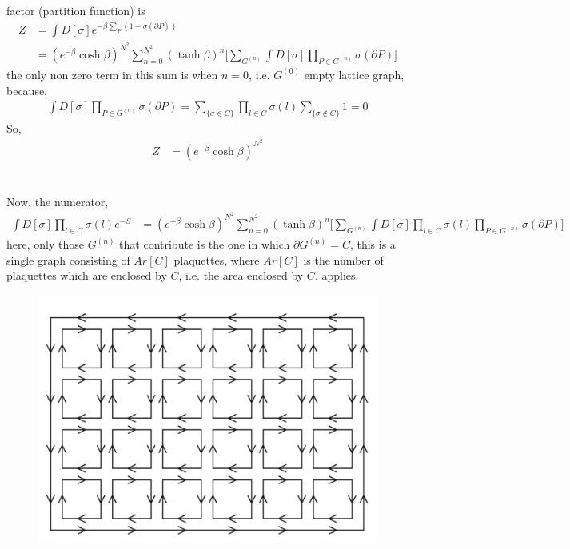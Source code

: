 \documentclass[]{article}
\numberwithin{equation}{section}
\begin{document}
factor (partition function) is
\begin{align}
    Z &=  \int D[\sigma]e^{-\beta\sum_{P}(1-\sigma(\partial P))}\\
    &=(e^{-\beta}\cosh{\beta})^{N^2}\sum_{n=0}^{N^2}(\tanh{\beta})^{n}\Bigg[\sum_{G^{(n)}}\int D[\sigma]\prod_{P\in G^{(n)}}\sigma(\partial P)\Bigg]
\end{align}
the only non zero term in this sum is when $n=0$, i.e. $G^{(0)}$ empty lattice graph, because,
\begin{align}
    \int D[\sigma]\prod_{P\in G^{(n)}}\sigma(\partial P) = \sum_{\{\sigma \in C\}}\prod_{l\in C}\sigma(l)\sum_{\{\sigma\notin C\}}1 = 0
\end{align}
So,
\begin{align}
Z&=(e^{-\beta}\cosh{\beta})^{N^2}
\end{align}
\\
\\

Now, the numerator,
\begin{align}
    \int D[\sigma]\prod_{l\in C}\sigma(l)e^{-S}&=(e^{-\beta}\cosh{\beta})^{N^2}\sum_{n=0}^{N^2}(\tanh{\beta})^{n}\Bigg[\sum_{G^{(n)}}\int D[\sigma]\prod_{l\in C}\sigma(l)\prod_{P\in G^{(n)}}\sigma(\partial P)\Bigg]
\end{align}
here, only those $G^{(n)}$ that contribute is the one in which $\partial G^{(n)} = C$, this
is a single graph consisting of $Ar[C]$ plaquettes, where $Ar[C]$ is the number
of plaquettes which are enclosed by $C$, i.e. the area enclosed by $C$.
applies. 
\begin{figure}
    \centering
    \includegraphics[scale=0.15]{IMG_DA3FC766B162-1.jpeg}
\end{figure}
\end{document}
